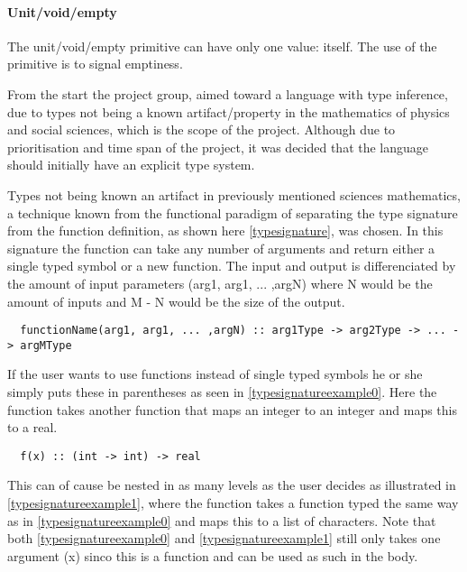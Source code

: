 \paragraph{Unit/void/empty}
\label{sec:unit/empty/void}

The unit/void/empty primitive can have only one value: itself. The use of the primitive is to signal emptiness.

From the start the project group, aimed toward a language with type inference, due to types not being a known artifact/property in the mathematics of physics and social sciences, which is the scope of the project. Although due to prioritisation and time span of the project, it was decided that the language should initially have an explicit type system.

Types not being known an artifact in previously mentioned sciences mathematics, a technique known from the functional paradigm of separating the type signature from the function definition, as shown here \cref{typesignature}, was chosen. In this signature the function can take any number of arguments and return either a single typed symbol or a new function. The input and output is differenciated by the amount of input parameters (arg1, arg1, ... ,argN) where N would be the amount of inputs and M - N would be the size of the output.

\begin{verbatim}
  functionName(arg1, arg1, ... ,argN) :: arg1Type -> arg2Type -> ... -> argMType
\end{verbatim}
\label{typesignature}

If the user wants to use functions instead of single typed symbols he or she simply puts these in parentheses as seen in \cref{typesignatureexample0}. Here the function takes another function that maps an integer to an integer and maps this to a real.

\begin{verbatim}
  f(x) :: (int -> int) -> real
\end{verbatim}
\label{typesignatureexample0}

This can of cause be nested in as many levels as the user decides as illustrated in \cref{typesignatureexample1}, where the function takes a function typed the same way as in \cref{typesignatureexample0} and maps this to a list of characters. Note that both \cref{typesignatureexample0} and \cref{typesignatureexample1} still only takes one argument (x) sinco this is a function and can be used as such in the body.

